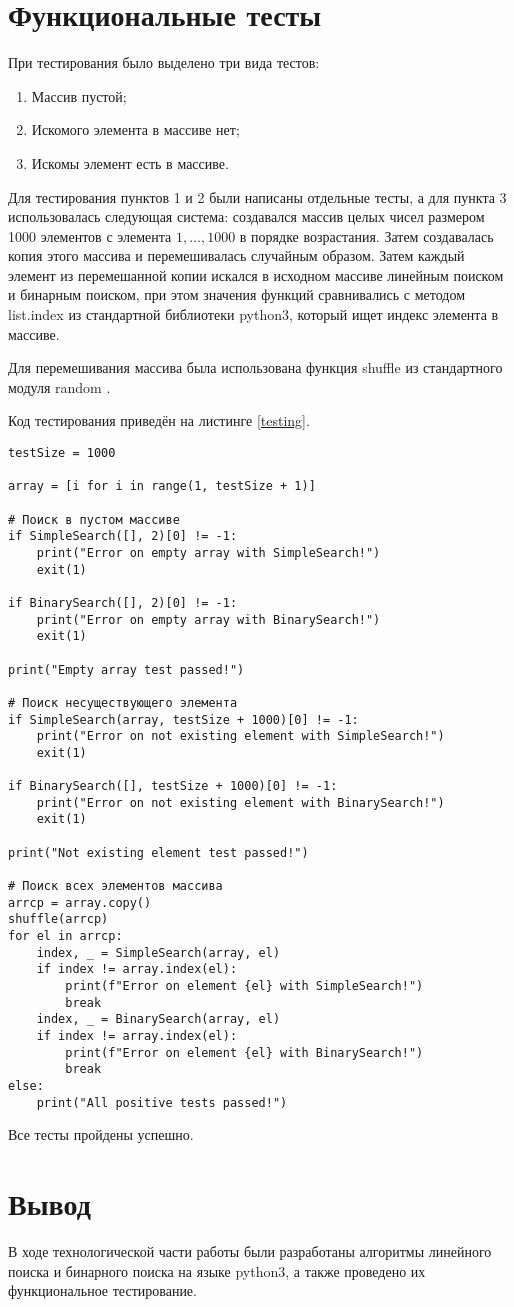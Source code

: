 \section{Функциональные тесты}

При тестирования было выделено три вида тестов:
\begin{enumerate}
	\item Массив пустой;
	\item Искомого элемента в массиве нет;
	\item Искомы элемент есть в массиве.
\end{enumerate}

Для тестирования пунктов 1 и 2 были написаны отдельные тесты, а для пункта 3 использовалась следующая система: создавался массив целых чисел размером 1000 элементов с элемента $1,\dots,1000$ в порядке возрастания. Затем создавалась копия этого массива и перемешивалась случайным образом. Затем каждый элемент из перемешанной копии искался в исходном массиве линейным поиском и бинарным поиском, при этом значения функций сравнивались с методом list.index \cite{python3-list} из стандартной библиотеки python3, который ищет индекс элемента в массиве.

Для перемешивания массива была использована функция shuffle из стандартного модуля random \cite{python3-shuffle}.

Код тестирования приведён на листинге \ref{testing}.

\begin{lstlisting}[label=testing,caption={Тестирование функций поиска}]
testSize = 1000

array = [i for i in range(1, testSize + 1)]

# Поиск в пустом массиве
if SimpleSearch([], 2)[0] != -1:
	print("Error on empty array with SimpleSearch!")
	exit(1)

if BinarySearch([], 2)[0] != -1:
	print("Error on empty array with BinarySearch!")
	exit(1)

print("Empty array test passed!")

# Поиск несуществующего элемента
if SimpleSearch(array, testSize + 1000)[0] != -1:
	print("Error on not existing element with SimpleSearch!")
	exit(1)

if BinarySearch([], testSize + 1000)[0] != -1:
	print("Error on not existing element with BinarySearch!")
	exit(1)

print("Not existing element test passed!")

# Поиск всех элементов массива
arrcp = array.copy()
shuffle(arrcp)
for el in arrcp:
	index, _ = SimpleSearch(array, el)
    if index != array.index(el):
		print(f"Error on element {el} with SimpleSearch!")
		break
	index, _ = BinarySearch(array, el)
	if index != array.index(el):
		print(f"Error on element {el} with BinarySearch!")
		break
else:
	print("All positive tests passed!")
\end{lstlisting}

Все тесты пройдены успешно.

\section*{Вывод}

В ходе технологической части работы были разработаны алгоритмы линейного поиска и бинарного поиска на языке python3, а также проведено их функциональное тестирование.

\clearpage
